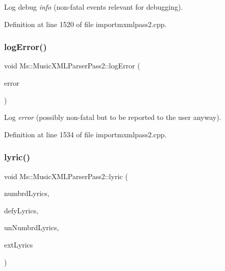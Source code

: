 Log debug {\itshape info} (non-\/fatal events relevant for debugging). 

Definition at line 1520 of file importmxmlpass2.\+cpp.

\mbox{\label{class_ms_1_1_music_x_m_l_parser_pass2_af55888c2ddfc198a3b1b7eec352873ca}} 
\subsubsection{\texorpdfstring{log\+Error()}{logError()}}
{\footnotesize\ttfamily void Ms\+::\+Music\+X\+M\+L\+Parser\+Pass2\+::log\+Error (\begin{DoxyParamCaption}\item[{const Q\+String \&}]{error }\end{DoxyParamCaption})}

Log {\itshape error} (possibly non-\/fatal but to be reported to the user anyway). 

Definition at line 1534 of file importmxmlpass2.\+cpp.

\mbox{\label{class_ms_1_1_music_x_m_l_parser_pass2_a484fe55303c211ed2d17c236976dfedc}} 
\subsubsection{\texorpdfstring{lyric()}{lyric()}}
{\footnotesize\ttfamily void Ms\+::\+Music\+X\+M\+L\+Parser\+Pass2\+::lyric (\begin{DoxyParamCaption}\item[{Q\+Map$<$ int, \hyperlink{class_ms_1_1_lyrics}{Lyrics} $\ast$$>$ \&}]{numbrd\+Lyrics,  }\item[{Q\+Map$<$ int, \hyperlink{class_ms_1_1_lyrics}{Lyrics} $\ast$$>$ \&}]{defy\+Lyrics,  }\item[{Q\+List$<$ \hyperlink{class_ms_1_1_lyrics}{Lyrics} $\ast$$>$ \&}]{un\+Numbrd\+Lyrics,  }\item[{Q\+Set$<$ \hyperlink{class_ms_1_1_lyrics}{Lyrics} $\ast$$>$ \&}]{ext\+Lyrics }\end{DoxyParamCaption})}

